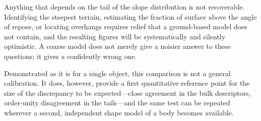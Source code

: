 Anything that depends on the tail of the slope distribution is not recoverable.
Identifying the steepest terrain, estimating the fraction of surface above the
angle of repose, or locating overhangs requires relief that a ground-based
model does not contain, and the resulting figures will be systematically and
silently optimistic. A coarse model does not merely give a noisier answer to
these questions; it gives a confidently wrong one.

Demonstrated as it is for a single object, this comparison is not a general
calibration. It does, however, provide a first quantitative reference point for
the size of the discrepancy to be expected---close agreement in the bulk
descriptors, order-unity disagreement in the tails---and the same test can be
repeated wherever a second, independent shape model of a body becomes
available.
